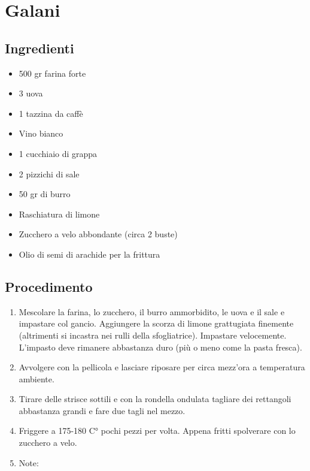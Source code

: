 \section{Galani}
\subsection{Ingredienti}
\begin{itemize}
\item 500 gr farina forte   
\item 3 uova  
\item 1 tazzina da caffè  
\item Vino bianco   
\item 1 cucchiaio di grappa  
\item 2 pizzichi di sale  
\item 50 gr di burro  
\item Raschiatura di limone   
\item Zucchero a velo abbondante (circa 2 buste)  
\item Olio di semi di arachide per la frittura
\end{itemize}
\subsection{Procedimento}
\begin{enumerate}
\item  Mescolare la farina, lo zucchero, il burro ammorbidito, le uova e il sale e impastare col gancio. Aggiungere la scorza di limone grattugiata finemente (altrimenti si incastra nei rulli della sfogliatrice). Impastare velocemente. L'impasto deve rimanere abbastanza duro (più o meno come la pasta fresca).  
\item  Avvolgere con la pellicola e lasciare riposare per circa mezz'ora a temperatura ambiente.  
\item  Tirare delle strisce sottili e con la rondella ondulata tagliare dei rettangoli abbastanza grandi e fare due tagli nel mezzo.  
\item  Friggere a 175-180 C° pochi pezzi per volta. Appena fritti spolverare con lo zucchero a velo.  
\item  Note: 
\end{enumerate}
